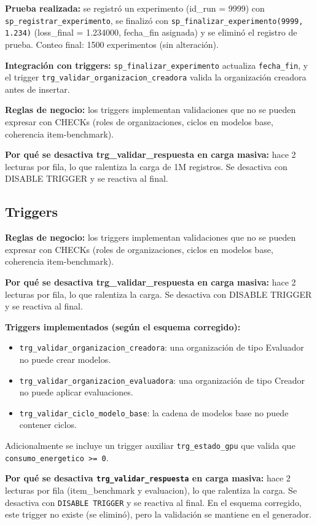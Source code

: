 \documentclass[12pt,a4paper]{article}
\begin{document}
\textbf{Prueba realizada:} se registró un experimento (id\_run = 9999) con \texttt{sp\_registrar\_experimento}, se finalizó con \texttt{sp\_finalizar\_experimento(9999, 1.234)} (loss\_final = 1.234000, fecha\_fin asignada) y se eliminó el registro de prueba. Conteo final: 1500 experimentos (sin alteración).

\textbf{Integración con triggers:} \texttt{sp\_finalizar\_experimento} actualiza \texttt{fecha\_fin}, y el trigger \texttt{trg\_validar\_organizacion\_creadora} valida la organización creadora antes de insertar.

\textbf{Reglas de negocio:} los triggers implementan validaciones que no se pueden expresar con CHECKs (roles de organizaciones, ciclos en modelos base, coherencia item-benchmark).

\textbf{Por qué se desactiva trg_validar_respuesta en carga masiva:} hace 2 lecturas por fila, lo que ralentiza la carga de 1M registros. Se desactiva con DISABLE TRIGGER y se reactiva al final.

\subsection{Triggers}

\textbf{Reglas de negocio:} los triggers implementan validaciones que no se pueden expresar con CHECKs (roles de organizaciones, ciclos en modelos base, coherencia item-benchmark).

\textbf{Por qué se desactiva trg_validar_respuesta en carga masiva:} hace 2 lecturas por fila, lo que ralentiza la carga. Se desactiva con DISABLE TRIGGER y se reactiva al final.

\textbf{Triggers implementados (según el esquema corregido):}
\begin{itemize}
  \item \texttt{trg\_validar\_organizacion\_creadora}: una organización de tipo Evaluador no puede crear modelos.
  \item \texttt{trg\_validar\_organizacion\_evaluadora}: una organización de tipo Creador no puede aplicar evaluaciones.
  \item \texttt{trg\_validar\_ciclo\_modelo\_base}: la cadena de modelos base no puede contener ciclos.
\end{itemize}

Adicionalmente se incluye un trigger auxiliar \texttt{trg\_estado\_gpu} que valida que \texttt{consumo\_energetico >= 0}.

\textbf{Por qué se desactiva \texttt{trg\_validar\_respuesta} en carga masiva:} hace 2 lecturas por fila (item\_benchmark y evaluacion), lo que ralentiza la carga. Se desactiva con \texttt{DISABLE TRIGGER} y se reactiva al final. En el esquema corregido, este trigger no existe (se eliminó), pero la validación se mantiene en el generador.
\end{document}
